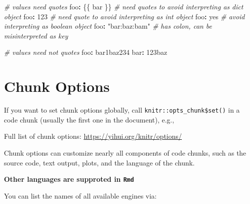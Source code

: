 \documentclass[
]{book}
\newenvironment{Shaded}{\begin{snugshade}}{\end{snugshade}}
\newcommand{\CommentTok}[1]{\textcolor[rgb]{0.56,0.35,0.01}{\textit{#1}}}
\newcommand{\DecValTok}[1]{\textcolor[rgb]{0.00,0.00,0.81}{#1}}
\newcommand{\InformationTok}[1]{\textcolor[rgb]{0.56,0.35,0.01}{\textbf{\textit{#1}}}}
\newcommand{\NormalTok}[1]{#1}
\newcommand{\SpecialCharTok}[1]{\textcolor[rgb]{0.81,0.36,0.00}{\textbf{#1}}}
\newcommand{\StringTok}[1]{\textcolor[rgb]{0.31,0.60,0.02}{#1}}
\begin{document}
\begin{Shaded}
\begin{Highlighting}[]
\CommentTok{\# values need quotes}
\NormalTok{foo}\SpecialCharTok{:} \StringTok{\textquotesingle{}\{\{ bar \}\}\textquotesingle{}} \CommentTok{\# need quotes to avoid interpreting as \textasciigrave{}dict\textasciigrave{} object}
\NormalTok{foo}\SpecialCharTok{:} \StringTok{\textquotesingle{}123\textquotesingle{}}       \CommentTok{\# need quote to avoid interpreting as \textasciigrave{}int\textasciigrave{} object}
\NormalTok{foo}\SpecialCharTok{:} \StringTok{\textquotesingle{}yes\textquotesingle{}}           \CommentTok{\# avoid interpreting as \textasciigrave{}boolean\textasciigrave{} object}
\NormalTok{foo}\SpecialCharTok{:} \StringTok{"bar:baz:bam"} \CommentTok{\# has colon, can be misinterpreted as key}

\CommentTok{\# values need not quotes}
\NormalTok{foo}\SpecialCharTok{:}\NormalTok{ bar1baz234}
\NormalTok{bar}\SpecialCharTok{:} \DecValTok{123}\NormalTok{baz}
\end{Highlighting}
\end{Shaded}

\section{Chunk Options}\label{chunk-options}

If you want to set chunk options globally, call \texttt{knitr::opts\_chunk\$set()} in a code chunk (usually the first one in the document), e.g.,

\begin{Shaded}
\end{Shaded}

Full list of chunk options: \url{https://yihui.org/knitr/options/}

Chunk options can customize nearly all components of code chunks, such as the source code, text output, plots, and the language of the chunk.

\textbf{Other languages are supproted in \texttt{Rmd}}

You can list the names of all available engines via:
\end{document}
